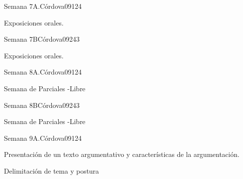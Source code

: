\begin{syllabus}
\begin{unit}{Semana 7A.}{Córdova09}{12}{4}
   \begin{topics}
      \item Exposiciones orales.
   \end{topics}
   \begin{unitgoals}
      \item 
   \end{unitgoals}
\end{unit}

\begin{unit}{Semana 7B}{Córdova09}{24}{3}
   \begin{topics}
      \item Exposiciones orales.
   \end{topics}

   \begin{unitgoals}
      \item 
      \item
      \item 
      \end{unitgoals}
\end{unit}


\begin{unit}{Semana 8A.}{Córdova09}{12}{4}
   \begin{topics}
      \item Semana de Parciales -Libre
   \end{topics}
   \begin{unitgoals}
      \item 
   \end{unitgoals}
\end{unit}

\begin{unit}{Semana 8B}{Córdova09}{24}{3}
   \begin{topics}
      \item Semana de Parciales -Libre
   \end{topics}

   \begin{unitgoals}
      \item 
      \item
      \item 
      \end{unitgoals}
\end{unit}


\begin{unit}{Semana 9A.}{Córdova09}{12}{4}
   \begin{topics}
      \item Presentación de un texto argumentativo y características de la argumentación.
      \item Delimitación de tema y postura


\end{topics}
\end{unit}
\end{syllabus}
